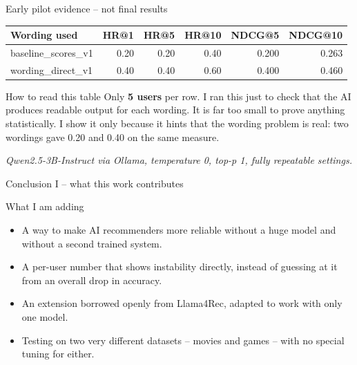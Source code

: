 \documentclass[aspectratio=169,12pt]{beamer}
\newcommand{\source}[1]{\vspace{0.35em}\par{\tiny\color{Muted}\textit{#1}}}
\begin{document}
\begin{frame}{Early pilot evidence -- not final results}
\begin{table}
\centering
\small
\begin{tabular}{lrrrrr}
\toprule
\textbf{Wording used} & \textbf{HR@1} & \textbf{HR@5} & \textbf{HR@10} & \textbf{NDCG@5} & \textbf{NDCG@10}\\
\midrule
baseline\_scores\_v1 & 0.20 & 0.20 & 0.40 & 0.200 & 0.263\\
wording\_direct\_v1 & 0.40 & 0.40 & 0.60 & 0.400 & 0.460\\
\bottomrule
\end{tabular}
\end{table}

\vspace{0.5em}
\begin{alertblock}{How to read this table}
Only \textbf{5 users} per row. I ran this just to check that the AI
produces readable output for each wording. It is far too small to prove
anything statistically. I show it only because it hints that the wording
problem is real: two wordings gave 0.20 and 0.40 on the same measure.
\end{alertblock}
\source{Qwen2.5-3B-Instruct via Ollama, temperature 0, top-p 1, fully repeatable settings.}
\end{frame}

\begin{frame}{Conclusion I -- what this work contributes}
\begin{block}{What I am adding}
\begin{itemize}
  \item A way to make AI recommenders more reliable without a huge model
        and without a second trained system.
  \item A per-user number that shows instability directly, instead of
        guessing at it from an overall drop in accuracy.
  \item An extension borrowed openly from Llama4Rec, adapted to work with
        only one model.
  \item Testing on two very different datasets -- movies and games -- with
        no special tuning for either.
\end{itemize}
\end{block}
\end{frame}
\end{document}
